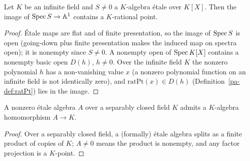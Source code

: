 \begin{lemma}
  \label{pa-lem:exists_ratPt_mem_range}
  \leanok

  Let \(K\) be an infinite field and \(S \neq 0\) a \(K\)-algebra \'etale over
  \(K[X]\). Then the image of \(\operatorname{Spec} S \to \mathbb{A}^1\) contains a \(K\)-rational point.
\end{lemma}
\begin{proof}
  \leanok
  \'Etale maps are flat and of finite presentation, so the image of \(\operatorname{Spec} S\) is open
  (going-down plus finite presentation makes the induced map on spectra open); it is
  nonempty since \(S \neq 0\). A nonempty open of \(\operatorname{Spec} K[X]\) contains a nonempty basic
  open \(D(h)\), \(h \neq 0\). Over the infinite field \(K\) the nonzero polynomial \(h\)
  has a non-vanishing value \(x\) (a nonzero polynomial function on an infinite field is
  not identically zero), and \(\mathrm{ratPt}(x) \in D(h)\)
  (Definition~\ref{pa-def:ratPt}) lies in the image.
\end{proof}

\begin{lemma}
  \label{pa-lem:exists_algHom_to_base}
  \leanok

  A nonzero \'etale algebra \(A\) over a separably closed field \(K\) admits a \(K\)-algebra
  homomorphism \(A \to K\).
\end{lemma}
\begin{proof}
  \leanok
  Over a separably closed field, a (formally) \'etale algebra splits as a finite product of
  copies of \(K\); \(A \neq 0\) means the product is nonempty, and any factor projection is
  a \(K\)-point.
\end{proof}

